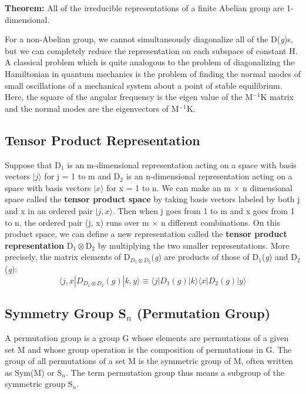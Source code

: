 \textbf{Theorem:} All of the irreducible representations of a finite Abelian group are 1-dimensional.

For a non-Abelian group, we cannot simultaneously diagonalize all of the D(\textit{g})s, 
but we can completely reduce the representation on each subspace of constant H.
A classical problem which is quite analogous to the problem of diagonalizing the Hamiltonian  in quantum mechanics 
is the problem of finding the normal modes of small oscillations of a mechanical system about a point of stable equilibrium. 
Here, the square of the angular frequency is the eigen value of the M$^{-1}$K matrix and the normal modes are the eigenvectors of M$^{-1}$K.

\subsection{Tensor Product Representation}
Suppose that D$_1$ is an m-dimensional representation acting on a space with basis vectors $|j\rangle$ for j = 1 to m and 
D$_2$ is an n-dimensional representation acting on a space with basis vectors $|x\rangle$ for x = 1 to n. 
We can make an m $\times$ n dimensional space called the \textbf{tensor product space} by taking basis vectors labeled by both j and x  in an ordered pair $|j, x\rangle$. 
Then when j goes from 1 to m and x goes from 1 to n, the ordered pair (j, x) runs over m $\times$ n different combinations. 
On this product space, we can define a new representation called the \textbf{tensor product representation} D$_1 \otimes$D$_2$ by multiplying the two smaller representations. 
More precisely, the matrix elements of D$_{D_1 \otimes D_2}$(\textit{g}) are products of those of D$_1$(\textit{g}) and D$_2$(\textit{g}):
\begin{equation}
    \langle j, x| D_{D_1 \otimes D_2}(g)|k, y \rangle \equiv \langle j| D_1(g)|k \rangle \langle x|D_2(g)|y \rangle
\end{equation}

\subsection{Symmetry Group \texorpdfstring{S$_n$}. (Permutation Group)}
A permutation group is a group G whose elements are permutations of a given set M and whose group operation is the composition of permutations in G.
The group of all permutations of a set M is the symmetric group of M, often written as Sym(M) or S$_n$. 
The term permutation group thus means a subgroup of the symmetric group S$_n$.

